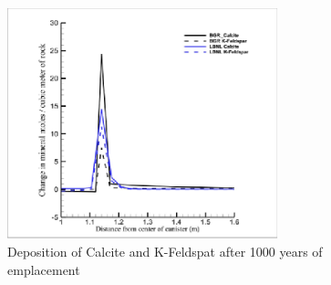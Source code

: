 \begin{figure}[htbp]
\centering
\includegraphics[width=0.7\textwidth]{THC/figures/fig93.eps}
\caption{Deposition of Calcite and K-Feldspat after 1000 years of emplacement}
\label{fig93}
\end{figure}



